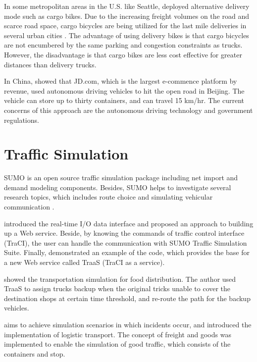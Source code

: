 \documentclass[12pt]{ksthesis}
\begin{document}
\begin{thesis}
{%
In some metropolitan areas in the U.S. like Seattle, \cite{Sheth2019} deployed alternative delivery mode such as cargo bikes. Due to the increasing freight volumes on the road and scarce road space, cargo bicycles are being utilized for the last mile deliveries in several urban cities \cite{Melo2017}. The advantage of using delivery bikes is that cargo bicycles are not encumbered by the same parking and congestion constraints as trucks. However, the disadvantage is that cargo bikes are less cost effective for greater distances than delivery trucks.

In China, \cite{Delivery2017} showed that JD.com, which is the largest e-commence platform by revenue, used autonomous driving vehicles to hit the open road in Beijing. The vehicle can store up to thirty containers, and can travel 15 km/hr. The current concerns of this approach are the autonomous driving technology and government regulations.

\section{Traffic Simulation}
SUMO is an open source traffic simulation package including net import and demand modeling components. Besides, SUMO helps to investigate several research topics, which includes route choice and simulating vehicular communication  \cite{Krajzewicz2007}.

\cite{10.1007/978-3-662-45079-6_5} introduced the real-time I/O data interface and proposed an approach to building up a Web service. Beside, by knowing the commands of traffic control interface (TraCI), the user can handle the communication with SUMO Traffic Simulation Suite. Finally, \cite{10.1007/978-3-662-45079-6_5} demonstrated an example of the code, which provides the base for a new Web service called TraaS (TraCI as a service).

\cite{Tunku2016} showed the transportation simulation for food distribution. The author used TraaS to assign trucks backup when the original tricks unable to cover the destination shops at certain time threshold, and re-route the path for the backup vehicles.

\cite{Kendziorra2015} aims to achieve simulation scenarios in which incidents occur, and introduced the implementation of logistic transport. The concept of freight and goods was implemented to enable the simulation of good traffic, which consists of the containers and stop.



}
\end{thesis}
\end{document}
